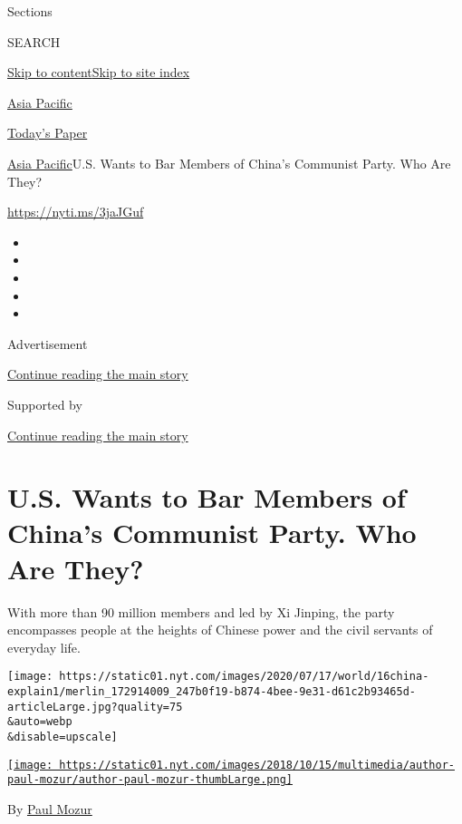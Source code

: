 Sections

SEARCH

\protect\hyperlink{site-content}{Skip to
content}\protect\hyperlink{site-index}{Skip to site index}

\href{https://www.nytimes.com/section/world/asia}{Asia Pacific}

\href{https://myaccount.nytimes.com/auth/login?response_type=cookie\&client_id=vi}{}

\href{https://www.nytimes.com/section/todayspaper}{Today's Paper}

\href{/section/world/asia}{Asia Pacific}\textbar{}U.S. Wants to Bar
Members of China's Communist Party. Who Are They?

\url{https://nyti.ms/3jaJGuf}

\begin{itemize}
\item
\item
\item
\item
\item
\end{itemize}

Advertisement

\protect\hyperlink{after-top}{Continue reading the main story}

Supported by

\protect\hyperlink{after-sponsor}{Continue reading the main story}

\hypertarget{us-wants-to-bar-members-of-chinas-communist-party-who-are-they}{%
\section{U.S. Wants to Bar Members of China's Communist Party. Who Are
They?}\label{us-wants-to-bar-members-of-chinas-communist-party-who-are-they}}

With more than 90 million members and led by Xi Jinping, the party
encompasses people at the heights of Chinese power and the civil
servants of everyday life.

\texttt{[image: https://static01.nyt.com/images/2020/07/17/world/16china-explain1/merlin\_172914009\_247b0f19-b874-4bee-9e31-d61c2b93465d-articleLarge.jpg?quality=75\\\&auto=webp\\\&disable=upscale]}

\href{https://www.nytimes.com/by/paul-mozur}{\texttt{[image: https://static01.nyt.com/images/2018/10/15/multimedia/author-paul-mozur/author-paul-mozur-thumbLarge.png]}}

By \href{https://www.nytimes.com/by/paul-mozur}{Paul Mozur}


